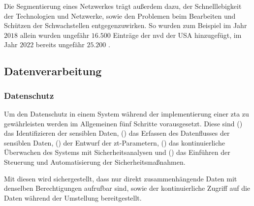 Die Segmentierung eines Netzwerkes trägt außerdem dazu, der Schnelllebigkeit der Technologien und Netzwerke, sowie den Problemen beim Bearbeiten und Schützen der Schwachstellen entgegenzuwirken.
So wurden zum Beispiel im Jahr $2018$ allein wurden ungefähr $16.500$ Einträge der \ac{nvd} der USA hinzugefügt, im Jahr $2022$ bereits ungefähr $25.200$ \autocites[\vglf][]{cunningham-2019}[\vglf][]{cve-2023}.

\subsection{Datenverarbeitung}\label{subsec:datenverarbeitung}
\subsubsection{Datenschutz}\label{subsubsec:datenschutz}
Um den Datenschutz in einem System während der implementierung einer \ac{zta} zu gewährleisten werden im Allgemeinen fünf Schritte vorausgesetzt.
Diese sind () das Identifizieren der sensiblen Daten, () das Erfassen des Datenflusses der sensiblen Daten, () der Entwurf der \ac{zt}-Parametern, () das kontinuierliche Überwachen des Systems mit Sicherheitsanalysen und () das Einführen der Steuerung und Automatisierung der Sicherheitsmaßnahmen.\autocites[\vglf][-3]{ahmed-2020}[\vglf][]{balaouras-2023}

Mit diesen wird sichergestellt, dass nur direkt zusammenhängende Daten mit denselben Berechtigungen aufrufbar sind, sowie der kontinuierliche Zugriff auf die Daten während der Umstellung bereitgestellt.


